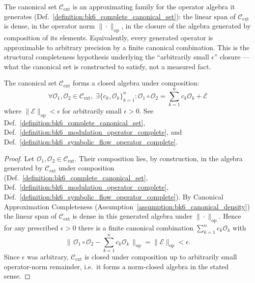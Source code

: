 \begin{assumption}
\label{assumption:bk6_canonical_density}
The canonical set $\mathcal{C}_{\text{ext}}$ is an approximating family for the operator algebra it generates (Def.~\ref{definition:bk6_complete_canonical_set}): the linear span of $\mathcal{C}_{\text{ext}}$ is dense, in the operator norm $\|\cdot\|_{\text{op}}$, in the closure of the algebra generated by composition of its elements. Equivalently, every generated operator is approximable to arbitrary precision by a finite canonical combination. This is the structural completeness hypothesis underlying the ``arbitrarily small $\epsilon$'' closure --- what the canonical set is constructed to satisfy, not a measured fact.
\end{assumption}

\begin{theorem}
\label{theorem:bk6_complete_operator_closure}
The canonical set $\mathcal{C}_{\text{ext}}$ forms a closed algebra under composition:
\begin{equation}
\forall \mathcal{O}_1, \mathcal{O}_2 \in \mathcal{C}_{\text{ext}}, \; \exists \{c_k, \mathcal{O}_k\}_{k=1}^n : \mathcal{O}_1 \circ \mathcal{O}_2 = \sum_{k=1}^n c_k \mathcal{O}_k + \mathcal{E}
\end{equation}
where $\|\mathcal{E}\|_{\text{op}} < \epsilon$ for arbitrarily small $\epsilon > 0$.
See Def.~\ref{definition:bk6_complete_canonical_set}, Def.~\ref{definition:bk6_modulation_operator_complete}, and Def.~\ref{definition:bk6_symbolic_flow_operator_complete}.
\end{theorem}
\begin{proof}
\label{proof:bk6_complete_operator_closure}
\leavevmode
Let $\mathcal{O}_1,\mathcal{O}_2\in\mathcal{C}_{\text{ext}}$. Their composition lies, by construction, in the algebra generated by $\mathcal{C}_{\text{ext}}$ under composition (Def.~\ref{definition:bk6_complete_canonical_set}, Def.~\ref{definition:bk6_modulation_operator_complete}, Def.~\ref{definition:bk6_symbolic_flow_operator_complete}). By Canonical Approximation Completeness (Assumption~\ref{assumption:bk6_canonical_density}) the linear span of $\mathcal{C}_{\text{ext}}$ is dense in this generated algebra under $\|\cdot\|_{\text{op}}$. Hence for any prescribed $\epsilon>0$ there is a finite canonical combination $\sum_{k=1}^n c_k\mathcal{O}_k$ with
\[
\Big\|\,\mathcal{O}_1\circ\mathcal{O}_2-\textstyle\sum_{k=1}^n c_k\mathcal{O}_k\,\Big\|_{\text{op}}=\|\mathcal{E}\|_{\text{op}}<\epsilon .
\]
Since $\epsilon$ was arbitrary, $\mathcal{C}_{\text{ext}}$ is closed under composition up to arbitrarily small operator-norm remainder, i.e.\ it forms a norm-closed algebra in the stated sense.
\end{proof}

